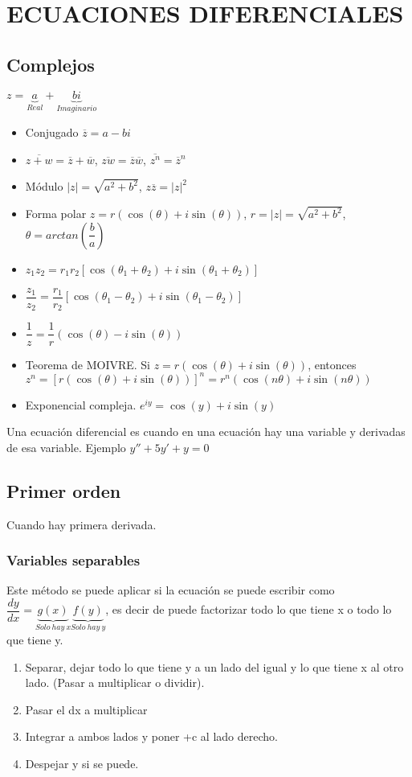 \section{ECUACIONES DIFERENCIALES}
\subsection{Complejos}
$z=\underbrace{a}_{Real}+\underbrace{bi}_{Imaginario}$
\begin{itemize}
	\item Conjugado $\overline{z}=a-bi$
	\item $\overline{z+w}=\overline{z}+\overline{w}$, $\overline{zw}=\overline{z}\overline{w}$, $\overline{z^n}=\overline{z}^n$
	\item Módulo $|z|=\sqrt{a^2+b^2}$, $z\overline{z}=|z|^2$
	\item Forma polar $z=r(\cos(\theta)+i\sin(\theta))$, $r=|z|=\sqrt{a^2+b^2}$, $\theta=arctan(\dfrac{b}{a})$
	\item $z_1z_2=r_1r_2[\cos(\theta_1+\theta_2)+i\sin(\theta_1+\theta_2)]$
	\item $\dfrac{z_1}{z_2}=\dfrac{r_1}{r_2}[\cos(\theta_1-\theta_2)+i\sin(\theta_1-\theta_2)]$
	\item $\dfrac{1}{z}=\dfrac{1}{r}(\cos(\theta)-i\sin(\theta))$
	\item Teorema de MOIVRE. Si $z=r(\cos(\theta)+i\sin(\theta))$, entonces $z^n=[r(\cos(\theta)+i\sin(\theta))]^n=r^n(\cos(n\theta)+i\sin(n\theta))$ 
	\item Exponencial compleja. $e^{iy}=\cos(y)+i\sin(y)$
\end{itemize}

Una ecuación diferencial es cuando en una ecuación hay una variable y derivadas de esa variable. Ejemplo $y''+5y'+y=0$

\subsection{Primer orden}
Cuando hay primera derivada.
\subsubsection{Variables separables}
Este método se puede aplicar si la ecuación se puede escribir como
$\dfrac{dy}{dx}=\underbrace{g(x)}_{Solo\ hay\ x}\underbrace{f(y)}_{Solo\ hay\ y}$, es decir de puede factorizar todo lo que tiene x o todo lo que tiene y.
\begin{enumerate}
	\item Separar, dejar todo lo que tiene y a un lado del igual y lo que tiene x al otro lado. (Pasar a multiplicar o dividir).
	\item Pasar el dx a multiplicar
	\item Integrar a ambos lados y poner +c al lado derecho.
	\item Despejar y si se puede.
\end{enumerate}

